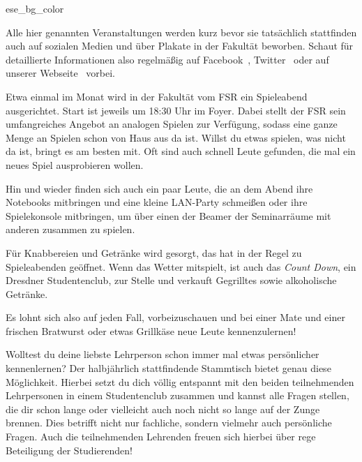 \label{cha:veranstaltungen}

\begin{awesomeblock}{2pt}{\faInfoCircle}{ese_bg_color}
    \begin{minipage}[t]{.82\textwidth}
        Alle hier genannten Veranstaltungen werden kurz bevor sie tatsächlich stattfinden auch auf sozialen Medien und über Plakate in der Fakultät beworben. Schaut für detaillierte Informationen also regelmäßig auf Facebook~, Twitter~ oder auf unserer Webseite~ vorbei.
    \end{minipage}
\end{awesomeblock}


Etwa einmal im Monat wird in der Fakultät vom FSR ein Spieleabend ausgerichtet. Start ist jeweils um 18:30 Uhr im Foyer. Dabei stellt der FSR sein umfangreiches Angebot an analogen Spielen zur Verfügung, sodass eine ganze Menge an Spielen schon von Haus aus da ist. Willst du etwas spielen, was nicht da ist, bringt es am besten mit. Oft sind auch schnell Leute gefunden, die mal ein neues Spiel ausprobieren wollen.

Hin und wieder finden sich auch ein paar Leute, die an dem Abend ihre Notebooks mitbringen und eine kleine LAN-Party schmeißen oder ihre Spielekonsole mitbringen, um über einen der Beamer der Seminarräume mit anderen zusammen zu spielen.

Für Knabbereien und Getränke wird gesorgt, das \ascii{} hat in der Regel zu Spieleabenden geöffnet. Wenn das Wetter mitspielt, ist auch das \emph{Count Down}, ein Dresdner Studentenclub, zur Stelle und verkauft Gegrilltes sowie alkoholische Getränke.

Es lohnt sich also auf jeden Fall, vorbeizuschauen und bei einer Mate und einer frischen Bratwurst oder etwas Grillkäse neue Leute kennenzulernen!

\pagebreak
 
% 


Wolltest du deine liebste Lehrperson schon immer mal etwas persönlicher kennenlernen? Der halbjährlich stattfindende Stammtisch bietet genau diese Möglichkeit. Hierbei setzt du dich völlig entspannt mit den beiden teilnehmenden Lehrpersonen in einem Studentenclub zusammen und kannst alle Fragen stellen, die dir schon lange oder vielleicht auch noch nicht so lange auf der Zunge brennen. Dies betrifft nicht nur fachliche, sondern vielmehr auch persönliche Fragen. Auch die teilnehmenden Lehrenden freuen sich hierbei über rege Beteiligung der Studierenden!

